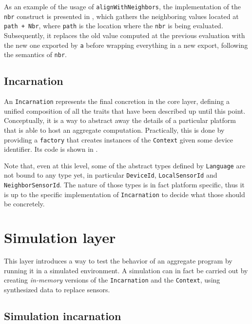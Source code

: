 As an example of the usage of \texttt{alignWithNeighbors}, the implementation of the \texttt{nbr} construct is presented in , which gathers the neighboring values located at \texttt{path + Nbr}, where \texttt{path} is the location where the \texttt{nbr} is being evaluated.
%
Subsequently, it replaces the old value computed at the previous evaluation with the new one exported by \texttt{a} before wrapping everything in a new export, following the semantics of \texttt{nbr}.
%


\subsection{Incarnation}

An \texttt{Incarnation} represents the final concretion in the core layer, defining a unified composition of all the traits that have been described up until this point.
%
Conceptually, it is a way to abstract away the details of a particular platform that is able to host an aggregate computation.
%
Practically, this is done by providing a \texttt{factory} that creates instances of the \texttt{Context} given some device identifier.
%
Its code is shown in .
%


Note that, even at this level, some of the abstract types defined by \texttt{Language} are not bound to any type yet, in particular \texttt{DeviceId}, \texttt{LocalSensorId} and \texttt{NeighborSensorId}.
%
The nature of those types is in fact platform specific, thus it is up to the specific implementation of \texttt{Incarnation} to decide what those should be concretely.

\section{Simulation layer}

This layer introduces a way to test the behavior of an aggregate program by running it in a simulated environment.
%
A simulation can in fact be carried out by creating \textit{in-memory} versions of the \texttt{Incarnation} and the \texttt{Context}, using synthesized data to replace sensors.

\subsection{Simulation incarnation}

